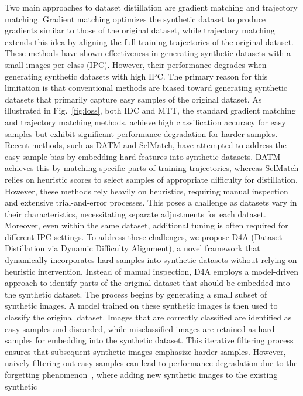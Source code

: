 \documentclass{article}
\theoremstyle{plain}
\theoremstyle{definition}
\theoremstyle{remark}
\begin{document}
Two main approaches to dataset distillation are gradient matching and trajectory matching. Gradient
matching optimizes the synthetic dataset to produce gradients similar to those of the original dataset,
while trajectory matching extends this idea by aligning the full training trajectories of the original dataset.
These methods have shown effectiveness in generating synthetic datasets with a small images-per-class (IPC).
However, their performance degrades when generating synthetic datasets with high IPC.
The primary reason for this limitation is that conventional methods are biased toward
generating synthetic datasets that primarily capture easy samples of the original dataset.
As illustrated in Fig.~\ref{fig:loss}, both IDC and MTT, the standard gradient matching and
trajectory matching methods, achieve high classification accuracy for easy samples but
exhibit significant performance degradation for harder samples.
Recent methods, such as DATM and SelMatch, have attempted to address the easy-sample bias by
embedding hard features into synthetic datasets. DATM achieves this by matching specific parts
of training trajectories, whereas SelMatch relies on heuristic scores to select
samples of appropriate difficulty for distillation.
However, these methods rely heavily on heuristics, requiring manual inspection and extensive
trial-and-error processes. This poses a challenge as datasets vary in their
characteristics, necessitating separate adjustments for each dataset. Moreover, even within
the same dataset, additional tuning is often required for different IPC settings.
To address these challenges, we propose D4A (Dataset Distillation via Dynamic Difficulty Alignment),
a novel framework that dynamically incorporates hard samples into synthetic datasets without
relying on heuristic intervention. Instead of manual inspection, D4A employs
a model-driven approach to identify parts of the original dataset that should be embedded
into the synthetic dataset.
The process begins by generating a small subset of synthetic images.
A model trained on these synthetic images is then used to classify the original dataset.
Images that are correctly classified are identified as easy samples and discarded,
while misclassified images are retained as hard samples for embedding into the synthetic dataset.
This iterative filtering process ensures that subsequent synthetic images emphasize harder samples.
However, naively filtering out easy samples can lead to performance degradation due
to the forgetting phenomenon~\cite{}, where adding new synthetic images to the existing synthetic
\end{document}
